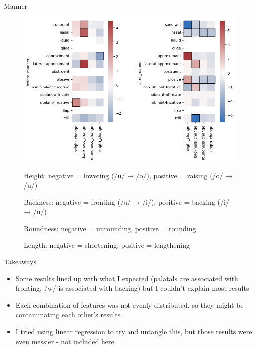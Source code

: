 \documentclass[10pt]{beamer}
\begin{document}
  \begin{frame}{Manner}
    \begin{figure}
      \centering
      \includegraphics[width=\textwidth, height=0.7\textheight, keepaspectratio]{manner_change.png}
      
      \scriptsize Height: negative = lowering (/u/ → /o/), positive = raising (/o/ → /u/)
      
      \scriptsize Backness: negative = fronting (/u/ → /i/), positive = backing (/i/ → /u/)
      
      \scriptsize Roundness: negative = unrounding, positive = rounding
      
      \scriptsize Length: negative = shortening, positive = lengthening
    \end{figure}
  \end{frame}
  \begin{frame}{Takeaways}
    \begin{itemize}
      \item Some results lined up with what I expected (palatals are associated with fronting, /w/ is associated with backing) but I couldn't explain most results
      \item Each combination of features was not evenly distributed, so they might be contaminating each other's results
      \item I tried using linear regression to try and untangle this, but those results were even messier - not included here
    \end{itemize}
  \end{frame}
\end{document}
